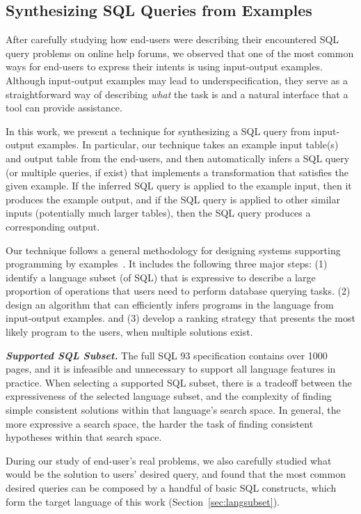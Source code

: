 \subsection{Synthesizing SQL Queries from Examples}

After carefully studying how end-users were describing their
encountered SQL query problems on online help forums, we observed that
one of the most common ways for end-users to
express their intents is using input-output examples. Although
input-output examples may lead to underspecification, they
serve as a straightforward way of describing \textit{what} the
task is and a natural interface that a tool can provide assistance.


In this work, we present a technique for synthesizing a SQL query
from input-output examples. In particular, our technique takes an example input
table(s) and output table from the end-users, and then automatically
infers a SQL query (or multiple queries, if exist) that implements
a transformation that satisfies the given example. If the inferred
SQL query is applied
to the example input, then it produces the example output, and if the
SQL query is applied to other similar inputs (potentially much larger tables),
then the SQL query produces a corresponding output.

Our technique follows a general methodology for designing
systems supporting programming by examples~\cite{Harris:2011}.
It includes the following three major steps:
(1) identify a language subset (of SQL) that is expressive to
describe a large proportion of operations that users need to perform
database querying tasks. (2) design an algorithm that
can efficiently infers programs in the language from input-output
examples. and (3) develop a ranking strategy that presents
the most likely program to the users, when multiple solutions exist.

\vspace{1mm}
\noindent \textbf{\textit{Supported SQL Subset.}}
The full SQL 93 specification contains over 1000 pages, and it is
infeasible and unnecessary to support all language features in practice.
When selecting a supported SQL subset, there is a tradeoff
between the expressiveness of the selected language subset,
and the complexity of finding simple consistent solutions
within that language's search space.  In general, the more expressive a search
space, the harder the task of finding consistent hypotheses within
that search space. 

During our study of end-user's real problems, we also carefully studied what would
be the solution to users' desired query, and found that the most common
desired queries can be composed by a handful of basic SQL constructs,
which form the target language of this work (Section~\ref{sec:langsubset}).

